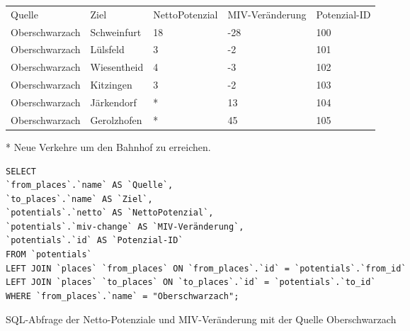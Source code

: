 \begin{tabularx}{\textwidth}{*5{X}}
Quelle & Ziel & NettoPotenzial & MIV-Veränderung & Potenzial-ID\\ 
Oberschwarzach & Schweinfurt & 18 & -28 & 100\\ 
Oberschwarzach & Lülsfeld & 3 & -2 & 101\\ 
Oberschwarzach & Wiesentheid & 4 & -3 & 102\\ 
Oberschwarzach & Kitzingen & 3 & -2 & 103\\ 
Oberschwarzach & Järkendorf & * & 13 & 104\\ 
Oberschwarzach & Gerolzhofen & * & 45 & 105\\ 
\end{tabularx}
\newline
\newline
* Neue Verkehre um den Bahnhof zu erreichen.
\newline
\begin{listing}[htbp]
\begin{verbatim}
SELECT
`from_places`.`name` AS `Quelle`, 
`to_places`.`name` AS `Ziel`, 
`potentials`.`netto` AS `NettoPotenzial`, 
`potentials`.`miv-change` AS `MIV-Veränderung`, 
`potentials`.`id` AS `Potenzial-ID`
FROM `potentials`
LEFT JOIN `places` `from_places` ON `from_places`.`id` = `potentials`.`from_id`
LEFT JOIN `places` `to_places` ON `to_places`.`id` = `potentials`.`to_id`
WHERE `from_places`.`name` = "Oberschwarzach";
\end{verbatim}
\caption{SQL-Abfrage der Netto-Potenziale und MIV-Veränderung mit der Quelle Oberschwarzach}\label{lst-fz-oberschwarzach}
\end{listing}
